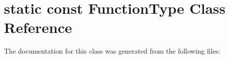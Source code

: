 \hypertarget{classstatic_01const_01FunctionType}{}\section{static const Function\+Type Class Reference}
\label{classstatic_01const_01FunctionType}


The documentation for this class was generated from the following files\+:
